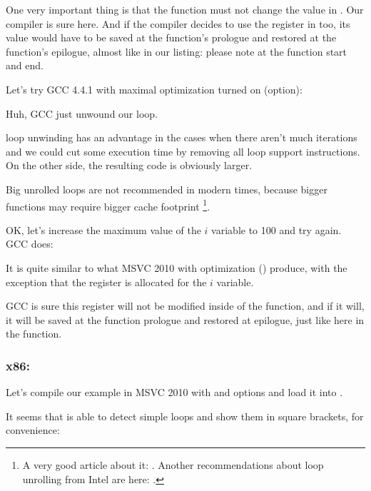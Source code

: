 One very important thing is that the \ttf function must not change the value in \ESI.
Our compiler is sure here. 
And if the compiler decides to use the \ESI register in \ttf too, its value would have to be saved 
at the function's prologue and restored at the function's epilogue,
almost like in our listing: please note 
at the function start and end.

Let's try GCC 4.4.1 with maximal optimization turned on (\Othree option):




Huh, GCC just unwound our loop.

\Gls{loop unwinding} has an advantage in the cases when there aren't much iterations and 
we could cut some execution time by removing all loop support instructions. 
On the other side, the resulting code is obviously larger.

Big unrolled loops are not recommended in modern times, because bigger functions
may require bigger cache footprint%
%
\footnote{A very good article about it: \DrepperMemory.
Another recommendations about loop unrolling from Intel are here: 
.}.

OK, let's increase the maximum value of the $i$ variable to 100 and try again. GCC does:



It is quite similar to what MSVC 2010 with optimization (\Ox) produce, 
with the exception that the \EBX register is allocated for the $i$ variable.

GCC is sure this register will not be modified inside of the \ttf function, 
and if it will, it will be saved at the function prologue and restored at epilogue, 
just like here in the \main function.

\clearpage
\subsubsection{x86: \olly}
\myindex{\olly}

Let's compile our example in MSVC 2010 with \Ox and \Obzero 
options and load it into \olly.

It seems that \olly is able to detect simple loops and show them in square brackets, for convenience:

